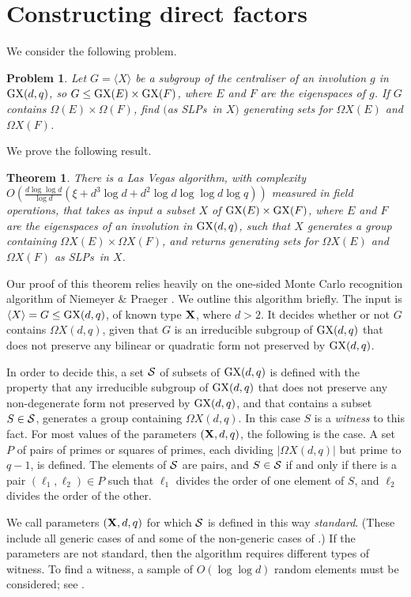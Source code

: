 \documentclass[12pt]{article}
\newtheorem{theorem}[definition]{Theorem}
\newtheorem{problem}[definition]{Problem}
\def\Oh{O}  %
\def\GX{{\rm GX}}
\def\X{{\rm X}}
\def\X{{\bf X}}
\def\SLPs{{\rm SLPs}}
\begin{document}
\section{Constructing direct factors}\label{Pow}
We consider the following problem.
\begin{problem}
Let $G = \langle X \rangle$ be a subgroup of
the centraliser of an involution $g$ in
$\GX(d,q)$, so $G \leq \GX(E)\times\GX(F)$, where
$E$ and $F$ are the eigenspaces of $g$.  If $G$ contains
$\Omega(E)\times\Omega(F)$, find $($as \SLPs\ in $X)$
generating sets for $\Omega X(E)$ and $\Omega X(F)$.
\end{problem}
We prove the following result.
\begin{theorem}  There is a Las Vegas algorithm, with complexity 
$\Oh(\frac{d\log\log d}{\log d}
(\xi +d^3 \log d + d^2 \log d \log\log d\log q))$
measured in
field operations, that takes as input a
subset $X$ of $\GX(E)\times\GX(F)$, where $E$ and $F$ are the
eigenspaces of an involution in $\GX(d,q)$, such that $X$ generates a group
containing $\Omega X(E)\times\Omega X(F)$, and returns
generating sets for $\Omega X(E)$ and $\Omega X(F)$ as \SLPs\ in $X$.
\end{theorem}

Our proof of this theorem relies heavily on the 
one-sided Monte Carlo recognition algorithm 
of Niemeyer \& Praeger \cite{NP, JAMS}.
We outline this algorithm briefly.  
The input is $\langle X \rangle = G \leq \GX(d,q)$, 
of known type $\X$, where $d>2$. 
It decides whether or not $G$ contains 
$\Omega X(d,q)$, given that
$G$ is an irreducible subgroup of $\GX(d,q)$ that does not
preserve any bilinear or quadratic form not preserved by $\GX(d,q)$.

In order to decide this, a set $\cal S$ of subsets of $\GX(d,q)$ is defined
with the property that any irreducible subgroup of $\GX(d,q)$ that does not
preserve any non-degenerate form not preserved by $\GX(d,q)$, and that
contains a subset $S\in\cal S$, generates a group containing $\Omega X(d,q)$.
In this case $S$ is a {\it witness} to this fact.
For most values of the parameters 
$(\X,d,q)$, the following is the case.  
A set $P$ of pairs of primes or squares of primes, each  
dividing $|\Omega X(d,q)|$ but prime to $q-1$,
is defined.  The elements of $\cal S$ are pairs,
and $S \in \cal S$ if and only if there is a pair  
$(\ell_1,\ell_2)\in P$ such that  $\ell_1$ divides the order of 
one element of $S$, and $\ell_2$ divides the order of the other.

We call parameters $(\X,d,q)$ for which $\cal S$ is defined in 
this way {\it standard}.
(These include all generic cases of \cite{NP}
and some of the non-generic cases of \cite{JAMS}.)
If the parameters are not standard,
then the algorithm requires different types of witness.
To find a witness, a sample of $\Oh(\log\log d)$  random 
elements must be considered; see \cite[Proposition 7.5]{NP}.
\end{document}

